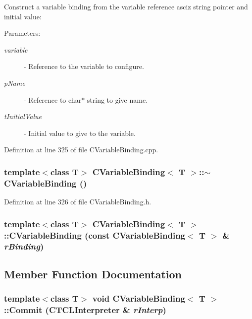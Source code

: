 Construct a variable binding from the variable reference asciz string pointer and initial value:\begin{Desc}
\item[Parameters: ]\par
\begin{description}
\item[{\em 
variable}]- Reference to the variable to configure. \item[{\em 
p\-Name}]- Reference to char$\ast$ string to give name. \item[{\em 
t\-Initial\-Value}]- Initial value to give to the variable. \end{description}
\end{Desc}


Definition at line 325 of file CVariable\-Binding.cpp.
\subsubsection{\setlength{\rightskip}{0pt plus 5cm}template$<$class T$>$ CVariable\-Binding$<$ T $>$::$\sim$CVariable\-Binding ()\hspace{0.3cm}{\tt  [inline]}}\label{classCVariableBinding_a2}




Definition at line 326 of file CVariable\-Binding.h.
\subsubsection{\setlength{\rightskip}{0pt plus 5cm}template$<$class T$>$ CVariable\-Binding$<$ T $>$::CVariable\-Binding (const CVariable\-Binding$<$ T $>$ \& {\em r\-Binding})\hspace{0.3cm}{\tt  [private]}}\label{classCVariableBinding_c0}




\subsection{Member Function Documentation}
\subsubsection{\setlength{\rightskip}{0pt plus 5cm}template$<$class T$>$ void CVariable\-Binding$<$ T $>$::Commit ({\bf CTCLInterpreter} \& {\em r\-Interp})\hspace{0.3cm}{\tt  [virtual]}}\label{classCVariableBinding_a14}


